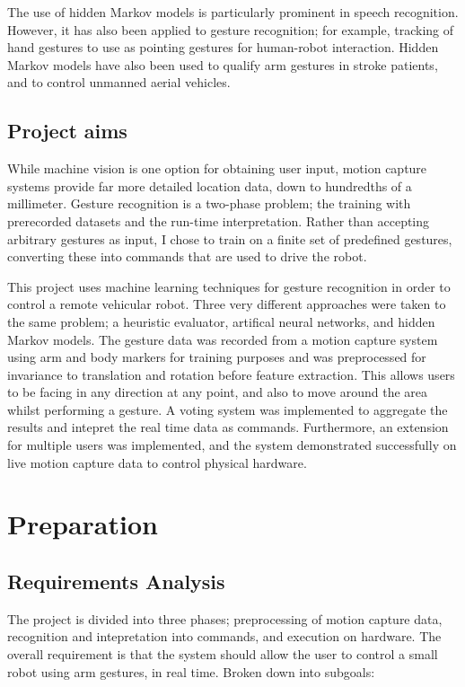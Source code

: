 \documentclass[12pt,a4,notitlepage]{report}
\renewcommand{\_}{\texttt{\symbol{95}}}
\newcommand{\<}{\texttt{\symbol{60}}}
\renewcommand{\>}{\texttt{\symbol{62}}}
\begin{document}
The use of hidden Markov models is particularly prominent in speech recognition. However, it has also been applied to gesture recognition; for example, tracking of hand gestures to use as pointing gestures for human-robot interaction\cite{HRI}. Hidden Markov models have also been used to qualify arm gestures in stroke patients\cite{AzLeder}, and to control unmanned aerial vehicles\cite{UAVs}.

\section{Project aims}

While machine vision is one option for obtaining user input, motion capture systems provide far more detailed location data, down to hundredths of a millimeter. Gesture recognition is a two-phase problem; the training with prerecorded datasets and the run-time interpretation. Rather than accepting arbitrary gestures as input, I chose to train on a finite set of predefined gestures, converting these into commands that are used to drive the robot. 

This project uses machine learning techniques for gesture recognition in order to control a remote vehicular robot. Three very different approaches were taken to the same problem; a heuristic evaluator, artifical neural networks, and hidden Markov models. The gesture data was recorded from a motion capture system using arm and body markers for training purposes and was preprocessed for invariance to translation and rotation before feature extraction. This allows users to be facing in any direction at any point, and also to move around the area whilst performing a gesture. A voting system was implemented to aggregate the results and intepret the real time data as commands. Furthermore, an extension for multiple users was implemented, and the system demonstrated successfully on live motion capture data to control physical hardware.

\chapter{Preparation}

\section{Requirements Analysis}

The project is divided into three phases; preprocessing of motion capture data, recognition and intepretation into commands, and execution on hardware. The overall requirement is that the system should allow the user to control a small robot using arm gestures, in real time. Broken down into subgoals:
\end{document}
